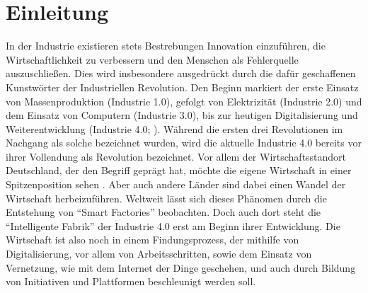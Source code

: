 \chapter{Einleitung}



In der Industrie existieren stets Bestrebungen Innovation einzuführen, die Wirtschaftlichkeit zu verbessern und den Menschen als Fehlerquelle auszuschließen. Dies wird insbesondere ausgedrückt durch die dafür geschaffenen Kunstwörter der Industriellen Revolution. Den Beginn markiert der erste Einsatz von Massenproduktion (Industrie 1.0), gefolgt von Elektrizität (Industrie 2.0) und dem Einsatz von Computern (Industrie 3.0), bis zur heutigen Digitalisierung und Weiterentwicklung (Industrie 4.0; ). Während die ersten drei Revolutionen im Nachgang als solche bezeichnet wurden, wird die aktuelle Industrie 4.0 bereits vor ihrer Vollendung als Revolution bezeichnet. Vor allem der Wirtschaftsstandort Deutschland, der den Begriff geprägt hat, möchte die eigene Wirtschaft in einer Spitzenposition sehen \autocite{arbeitsbericht}. Aber auch andere Länder sind dabei einen Wandel der Wirtschaft herbeizuführen. Weltweit lässt sich dieses Phänomen durch die Entstehung von \enquote{Smart Factories} beobachten. Doch auch dort steht die \enquote{Intelligente Fabrik} der Industrie 4.0 erst am Beginn ihrer Entwicklung. Die Wirtschaft ist also noch in einem Findungsprozess, der mithilfe von Digitalisierung, vor allem von Arbeitsschritten, sowie dem Einsatz von Vernetzung, wie mit dem Internet der Dinge geschehen, und auch durch Bildung von Initiativen und Plattformen beschleunigt werden soll.


